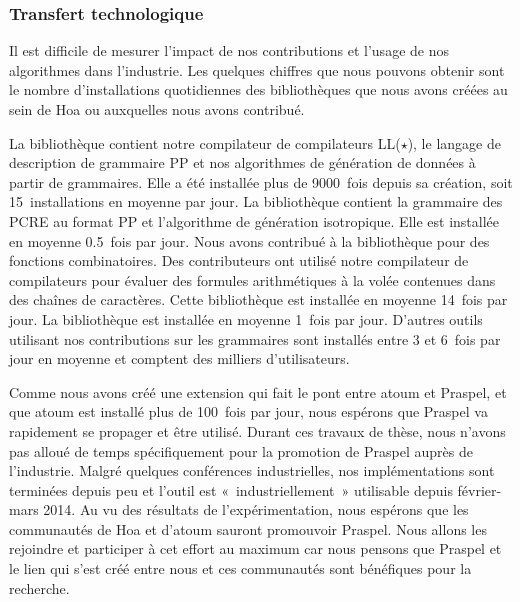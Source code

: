 \subsubsection{Transfert technologique}

Il est difficile de mesurer l'impact de nos contributions et l'usage de nos
algorithmes dans l'industrie. Les quelques chiffres que nous pouvons obtenir
sont le nombre d'installations quotidiennes des bibliothèques que nous avons
créées au sein de Hoa ou auxquelles nous avons contribué.

La bibliothèque  contient notre compilateur de
compilateurs LL($\star$), le langage de description de grammaire PP et nos
algorithmes de génération de données à partir de grammaires. Elle a été
installée plus de 9000~fois depuis sa création, soit 15~installations en moyenne
par jour. La bibliothèque  contient la grammaire des
PCRE au format PP et l'algorithme de génération isotropique. Elle est installée
en moyenne 0.5~fois par jour. Nous avons contribué à la bibliothèque
 pour des fonctions combinatoires. Des contributeurs ont
utilisé notre compilateur de compilateurs pour évaluer des formules
arithmétiques à la volée contenues dans des chaînes de caractères. Cette
bibliothèque est installée en moyenne 14~fois par jour. La bibliothèque
 est installée en moyenne 1~fois par jour.  D'autres
outils utilisant nos contributions sur les grammaires sont installés entre 3 et
6~fois par jour en moyenne et comptent des milliers d'utilisateurs. 

Comme nous avons créé une extension qui fait le pont entre atoum et Praspel, et
que atoum est installé plus de 100~fois par jour, nous espérons que Praspel va
rapidement se propager et être utilisé. Durant ces travaux de thèse, nous
n'avons pas alloué de temps spécifiquement pour la promotion de Praspel auprès
de l'industrie. Malgré quelques conférences industrielles, nos implémentations
sont terminées depuis peu et l'outil est «~industriellement~» utilisable depuis
février-mars 2014. Au vu des résultats de l'expérimentation, nous espérons que
les communautés de Hoa et d'atoum sauront promouvoir Praspel. Nous allons les
rejoindre et participer à cet effort au maximum car nous pensons que Praspel et
le lien qui s'est créé entre nous et ces communautés sont bénéfiques pour la
recherche.

